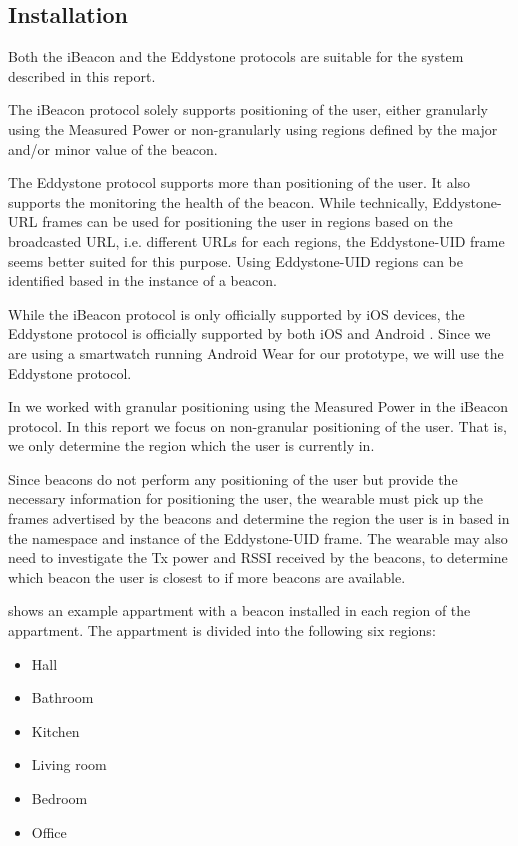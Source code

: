 \subsection{Installation}

Both the iBeacon and the Eddystone protocols are suitable for the system described in this report. 

The iBeacon protocol solely supports positioning of the user, either granularly using the Measured Power or non-granularly using regions defined by the major and/or minor value of the beacon.

The Eddystone protocol supports more than positioning of the user. It also supports the monitoring the health of the beacon. While technically, Eddystone-URL frames can be used for positioning the user in regions based on the broadcasted URL, i.e. different URLs for each regions, the Eddystone-UID frame seems better suited for this purpose. Using Eddystone-UID regions can be identified based in the instance of a beacon.

While the iBeacon protocol is only officially supported by iOS devices, the Eddystone protocol is officially supported by both iOS and Android \cite{estimote:what-is-eddystone}. Since we are using a smartwatch running Android Wear for our prototype, we will use the Eddystone protocol.

In \cite{prespecialisation} we worked with granular positioning using the Measured Power in the iBeacon protocol. In this report we focus on non-granular positioning of the user. That is, we only determine the region which the user is currently in.

Since beacons do not perform any positioning of the user but provide the necessary information for positioning the user, the wearable must pick up the frames advertised by the beacons and determine the region the user is in based in the namespace and instance of the Eddystone-UID frame. The wearable may also need to investigate the Tx power and RSSI received by the beacons, to determine which beacon the user is closest to if more beacons are available.

 shows an example appartment with a beacon installed in each region of the appartment. The appartment is divided into the following six regions:

\begin{itemize}
\item Hall
\item Bathroom
\item Kitchen
\item Living room
\item Bedroom
\item Office
\end{itemize}

